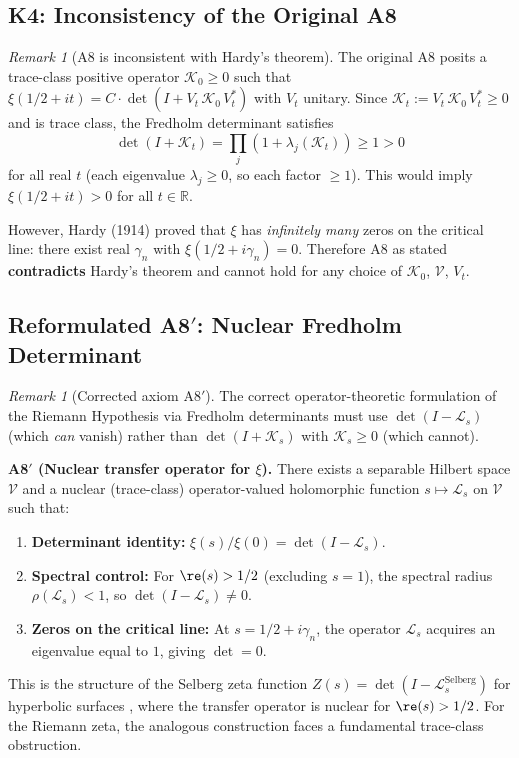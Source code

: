 \documentclass[12pt,a4paper]{article}
\theoremstyle{definition}
\theoremstyle{remark}
\newtheorem{remark}[theorem]{Remark}
\begin{document}
\subsection{K4: Inconsistency of the Original A8}

\begin{remark}[A8 is inconsistent with Hardy's theorem]\label{rem:A8-inconsistency}
The original A8 posits a trace-class positive operator $\mathcal{K}_0 \ge 0$ such that
$\xi(1/2+it) = C \cdot \det(I + V_t\,\mathcal{K}_0\,V_t^*)$
with $V_t$ unitary. Since $\mathcal{K}_t := V_t\,\mathcal{K}_0\,V_t^* \ge 0$ and is trace class, the Fredholm determinant satisfies
\[
  \det(I + \mathcal{K}_t) = \prod_{j} (1 + \lambda_j(\mathcal{K}_t)) \ge 1 > 0
\]
for all real $t$ (each eigenvalue $\lambda_j \ge 0$, so each factor $\ge 1$). This would imply $\xi(1/2+it) > 0$ for all $t \in \mathbb{R}$.

However, Hardy (1914) proved that $\xi$ has \emph{infinitely many} zeros on the critical line: there exist real $\gamma_n$ with $\xi(1/2 + i\gamma_n) = 0$. Therefore A8 as stated \textbf{contradicts} Hardy's theorem and cannot hold for any choice of $\mathcal{K}_0$, $\mathcal{V}$, $V_t$.
\end{remark}

\subsection{Reformulated A8$'$: Nuclear Fredholm Determinant}

\begin{remark}[Corrected axiom A8$'$]\label{rem:A8-reformulated}
The correct operator-theoretic formulation of the Riemann Hypothesis via Fredholm determinants must use $\det(I - \mathcal{L}_s)$ (which \emph{can} vanish) rather than $\det(I + \mathcal{K}_s)$ with $\mathcal{K}_s \ge 0$ (which cannot).

\medskip\noindent
\textbf{A8$'$ (Nuclear transfer operator for $\xi$).}
There exists a separable Hilbert space $\mathcal{V}$ and a nuclear (trace-class) operator-valued holomorphic function $s \mapsto \mathcal{L}_s$ on $\mathcal{V}$ such that:
\begin{enumerate}[label=(\roman*),nosep]
\item \textbf{Determinant identity:} $\xi(s)/\xi(0) = \det(I - \mathcal{L}_s)$.
\item \textbf{Spectral control:} For $\re(s) > 1/2$ (excluding $s=1$), the spectral radius $\rho(\mathcal{L}_s) < 1$, so $\det(I - \mathcal{L}_s) \ne 0$.
\item \textbf{Zeros on the critical line:} At $s = 1/2 + i\gamma_n$, the operator $\mathcal{L}_s$ acquires an eigenvalue equal to $1$, giving $\det = 0$.
\end{enumerate}
This is the structure of the Selberg zeta function $Z(s) = \det(I - \mathcal{L}_s^{\mathrm{Selberg}})$ for hyperbolic surfaces \cite{Ruelle1976,Mayer1991}, where the transfer operator is nuclear for $\re(s) > 1/2$. For the Riemann zeta, the analogous construction faces a fundamental trace-class obstruction.
\end{remark}
\end{document}
